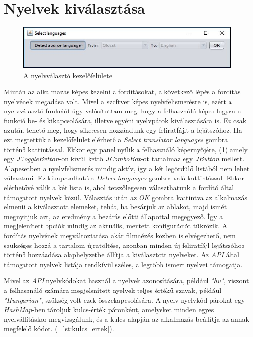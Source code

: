 \section{Nyelvek kiválasztása}

\begin{figure}[h!]
  \includegraphics[width=\linewidth]{images/language_selection.jpg}
  \caption{A nyelvválasztó kezelőfelülete}
  \label{fig:language_selection}
\end{figure}

Miután az alkalmazás képes kezelni a fordításokat, a következő lépés a fordítás nyelvének megadása volt. Mivel a szoftver képes nyelvfelismerésre is, ezért a nyelvválasztó funkciót úgy valósítottam meg, hogy a felhasználó képes legyen e funkció be- és kikapcsolására, illetve egyéni nyelvpárok kiválasztására is.  Ez csak azután tehető meg, hogy sikeresen hozzáadunk egy feliratfájlt a lejátszóhoz. Ha ezt megtettük a kezelőfelület elérhető a \textit{Select translator languages} gombra történő kattintással.  Ekkor egy panel nyílik a felhasználó képernyőjére, (\ref{fig:language_selection}) amely egy \textit{JToggleButton}-on kívül kettő \textit{JComboBox}-ot tartalmaz egy \textit{JButton} mellett. Alapesetben a nyelvfelismerés mindig aktív, így a két legördülő listából nem lehet választani. Ez kikapcsolható a \textit{Detect languages} gombra való kattintással. Ekkor elérhetővé válik a két lista is, ahol tetszőlegesen választhatunk a fordító által támogatott nyelvek közül. Választás után az \textit{OK} gombra kattintva az alkalmazás elmenti a kiválasztott elemeket, tehát, ha bezárjuk az ablakot, majd ismét megnyitjuk azt, az eredmény a bezárás előtti állapottal megegyező. Így a megjelenített opciók mindig az aktuális, mentett konfigurációt tükrözik. A fordítás nyelvének megváltoztatása akár filmnézés közben is elvégezhető, nem szükséges hozzá a tartalom újratöltése, azonban minden új feliratfájl lejátszóhoz történő hozzáadása alaphelyzetbe állítja a kiválasztott nyelveket. Az \textit{API} által támogatott nyelvek listája rendkívül széles, a legtöbb ismert nyelvet támogatja.

Mivel az \textit{API} nyelvkódokat használ a nyelvek azonosítására, például \textit{"hu"}, viszont a felhasználó számára megjelenített nyelvek teljes értékű szavak, például \textit{"Hungarian"}, szükség volt ezek összekapcsolására. A nyelv-nyelvkód párokat egy \textit{HashMap}-ben tároljuk kulcs-érték páronként, amelyeket minden egyes nyelvállításkor megvizsgálunk, és  a kulcs alapján az alkalmazás beállítja az annak megfelelő kódot. (\lstlistingname~\ref{lst:kulcs_ertek}).

